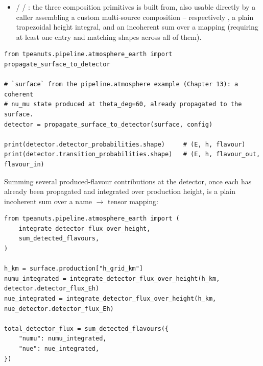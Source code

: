 \begin{implbox}
\begin{itemize}
{    config, *, flavour\_order=None, profile\_earth=None,
    trajectory\_steps=200, integrate\_angular=False, integrate\_energy=False)}:
    given  (aligned
    energy/height/angle grids across flavours, missing flavours treated as
    zero production flux), propagates each produced flavour at each zenith
    angle in turn, stacks the resulting transition matrices and production
    fluxes, and evaluates the weighted-average identity derived above.
  \item {} /  / : the three composition
    primitives  is built
    from, also usable directly by a caller assembling a custom multi-source
    composition -- respectively , a
    plain trapezoidal height integral, and an incoherent sum over a
     mapping (requiring at least one entry and
    matching shapes across all of them).
\end{itemize}
\end{implbox}

\begin{examplebox}[title={Continuing the atmosphere surface state through the Earth}]
\begin{lstlisting}[style=tpython]
from tpeanuts.pipeline.atmosphere_earth import propagate_surface_to_detector

# `surface` from the pipeline.atmosphere example (Chapter 13): a coherent
# nu_mu state produced at theta_deg=60, already propagated to the surface.
detector = propagate_surface_to_detector(surface, config)

print(detector.detector_probabilities.shape)     # (E, h, flavour)
print(detector.transition_probabilities.shape)   # (E, h, flavour_out, flavour_in)
\end{lstlisting}
\end{examplebox}

Summing several produced-flavour contributions at the detector, once each
has already been propagated and integrated over production height, is a
plain incoherent sum over a name $\to$ tensor mapping:
\begin{examplebox}[title={Combining $\nu_\mu$- and $\nu_e$-produced contributions at the detector}]
\begin{lstlisting}[style=tpython]
from tpeanuts.pipeline.atmosphere_earth import (
    integrate_detector_flux_over_height,
    sum_detected_flavours,
)

h_km = surface.production["h_grid_km"]
numu_integrated = integrate_detector_flux_over_height(h_km, detector.detector_flux_Eh)
nue_integrated = integrate_detector_flux_over_height(h_km, nue_detector.detector_flux_Eh)

total_detector_flux = sum_detected_flavours({
    "numu": numu_integrated,
    "nue": nue_integrated,
})
\end{lstlisting}
\end{examplebox}

